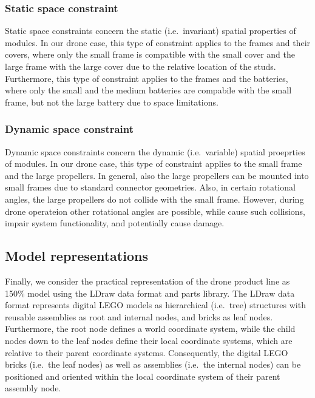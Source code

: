 \documentclass[sigconf,review]{acmart}
\begin{document}
\subsubsection*{Static space constraint}

Static space constraints concern the static (i.e.\ invariant) spatial properties of modules.
In our drone case, this type of constraint applies to the frames and their covers, where only the small frame is compatible with the small cover and the large frame with the large cover due to the relative location of the studs.
Furthermore, this type of constraint applies to the frames and the batteries, where only the small and the medium batteries are compabile with the small frame, but not the large battery due to space limitations.

\subsubsection*{Dynamic space constraint}

Dynamic space constraints concern the dynamic (i.e.\ variable) spatial proeprties of modules.
In our drone case, this type of constraint applies to the small frame and the large propellers.
In general, also the large propellers can be mounted into small frames due to standard connector geometries.
Also, in certain rotational angles, the large propellers do not collide with the small frame.
However, during drone operateion other rotational angles are possible, while cause such collisions, impair system functionality, and potentially cause damage.

\subsection{Model representations}
\label{sec:150-model}

Finally, we consider the practical representation of the drone product line as 150\% model using the LDraw data format and parts library.
The LDraw data format represents digital LEGO models as hierarchical (i.e.\ tree) structures with reusable assemblies as root and internal nodes, and bricks as leaf nodes.
Furthermore, the root node defines a world coordinate system, while the child nodes down to the leaf nodes define their local coordinate systems, which are relative to their parent coordinate systems.
Consequently, the digital LEGO bricks (i.e.\ the leaf nodes) as well as assemblies (i.e.\ the internal nodes) can be positioned and oriented within the local coordinate system of their parent assembly node.
\end{document}
